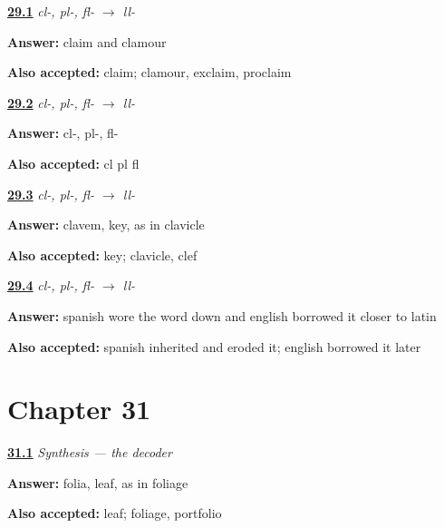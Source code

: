 \noindent\begin{minipage}[t]{\linewidth}
\raggedright
\hyperlink{review-ES-C57-ll-claim}{\textbf{29.1}} \emph{cl-, pl-, fl- $\to$ ll-}\par
\small \textbf{Answer:} claim and clamour\par
\footnotesize \textbf{Also accepted:} claim; clamour, exclaim, proclaim
\end{minipage}\par\medskip

\noindent\begin{minipage}[t]{\linewidth}
\raggedright
\hyperlink{review-ES-C57-ll-three}{\textbf{29.2}} \emph{cl-, pl-, fl- $\to$ ll-}\par
\small \textbf{Answer:} cl-, pl-, fl-\par
\footnotesize \textbf{Also accepted:} cl pl fl
\end{minipage}\par\medskip

\noindent\begin{minipage}[t]{\linewidth}
\raggedright
\hyperlink{review-ES-C57-ll-decode}{\textbf{29.3}} \emph{cl-, pl-, fl- $\to$ ll-}\par
\small \textbf{Answer:} clavem, key, as in clavicle\par
\footnotesize \textbf{Also accepted:} key; clavicle, clef
\end{minipage}\par\medskip

\noindent\begin{minipage}[t]{\linewidth}
\raggedright
\hyperlink{review-ES-C57-ll-shape}{\textbf{29.4}} \emph{cl-, pl-, fl- $\to$ ll-}\par
\small \textbf{Answer:} spanish wore the word down and english borrowed it closer to latin\par
\footnotesize \textbf{Also accepted:} spanish inherited and eroded it; english borrowed it later
\end{minipage}\par\medskip

\section*{Chapter 31}

\noindent\begin{minipage}[t]{\linewidth}
\raggedright
\hyperlink{review-ES-C57-sintesis-descifrar-h}{\textbf{31.1}} \emph{Synthesis — the decoder}\par
\small \textbf{Answer:} folia, leaf, as in foliage\par
\footnotesize \textbf{Also accepted:} leaf; foliage, portfolio
\end{minipage}\par\medskip

